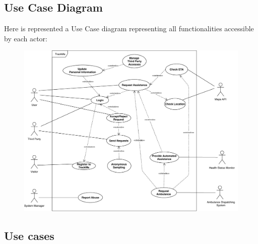 \documentclass[12pt,a4paper]{article}
\begin{document}
	\subsection{Use Case Diagram}
	Here is represented a Use Case diagram representing all functionalities accessible by each actor:
	\begin{figure}[h]
		\centering
		\includegraphics[width=1.25\linewidth]{Images/use_case_diagram}
		\label{fig:use_case_diagram}
	\end{figure}

	\newpage
	\subsection{Use cases}
\end{document}
